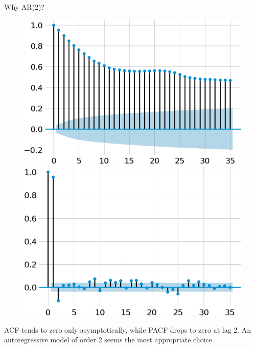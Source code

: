 \documentclass[10pt]{beamer}
\theoremstyle{remark}
\theoremstyle{definition}
\begin{document}
\begin{frame}{Why AR(2)?}
    \begin{figure}[h!]
        \centering
        \begin{minipage}[t]{0.4\textwidth}
          \centering
          \includegraphics[scale=0.2]{acf.png}
        \end{minipage}\hfill
        \begin{minipage}[t]{0.6\textwidth}
          \centering
          \includegraphics[scale=0.2]{pacf.png}
        \end{minipage}
    \end{figure}
    ACF tends to zero only asymptotically, while PACF drops to zero at lag 2. An autoregressive model of order 2 seems the most appropriate choice.
\end{frame}
\end{document}
